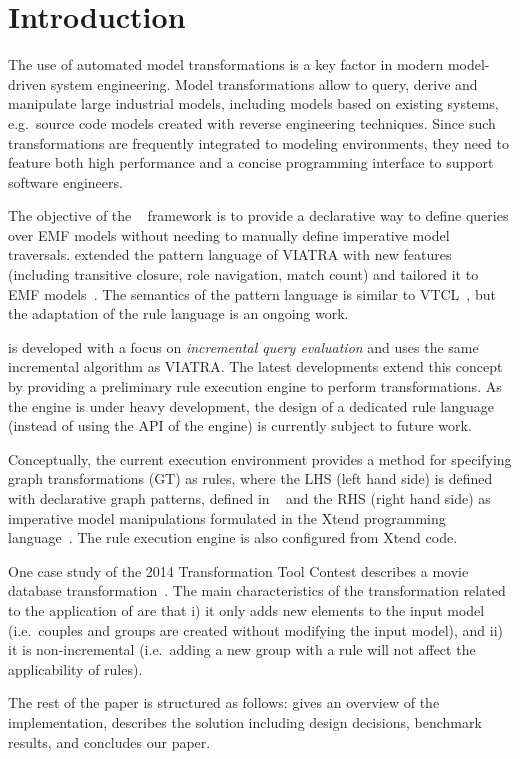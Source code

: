 \section{Introduction}

The use of automated model transformations is a key factor in modern model-driven system engineering. Model transformations allow to query, derive and manipulate large industrial models, including models based on existing systems, e.g.\ source code models created with reverse engineering techniques. Since such transformations are frequently integrated to modeling environments, they need to feature both high performance and a concise programming interface to support software engineers.

The objective of the \incquery{}~\cite{eiq-hompage} framework is to provide a declarative way to define queries over EMF models without needing to manually define imperative model traversals. \incquery{} extended the pattern language of VIATRA with new features (including transitive closure, role navigation, match count) and tailored it to EMF models~\cite{iqpl}. The semantics of the pattern language is similar to VTCL~\cite{Varro2007214}, but the adaptation of the rule language is an ongoing work.

\incquery{} is developed with a focus on \emph{incremental query evaluation} and uses the same incremental algorithm as VIATRA. The latest developments extend this concept by providing a preliminary rule execution engine to perform transformations. As the engine is under heavy development, the design of a dedicated rule language (instead of using the API of the engine) is currently subject to future work. 

Conceptually, the current execution environment provides a method for specifying graph transformations (GT) as rules, where the LHS (left hand side) is defined with declarative \incquery{} graph patterns, defined in \iqpl{}~\cite{iqpl} and the RHS (right hand side) as imperative model manipulations formulated in the Xtend programming language~\cite{xtend}. The rule execution engine is also configured from Xtend code.

One case study of the 2014 Transformation Tool Contest describes a movie database transformation~\cite{Horn14}. The main characteristics of the transformation related to the application of \incquery{} are that i) it only adds new elements to the input model (i.e.\ couples and groups are created without modifying the input model), and ii) it is non-incremental (i.e.\ adding a new group with a rule will not affect the applicability of rules).

The rest of the paper is structured as follows:  gives an overview of the implementation,  describes the solution including design decisions, benchmark results, and  concludes our paper.
